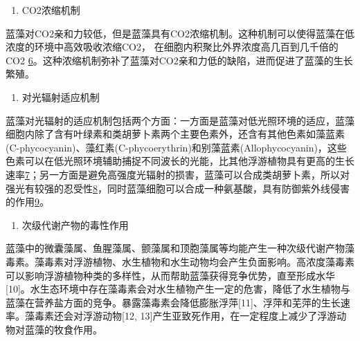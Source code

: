 \documentclass[]{book}
\providecommand{\tightlist}{%
  \setlength{\itemsep}{0pt}\setlength{\parskip}{0pt}}
\begin{document}
\begin{enumerate}
\def\labelenumi{\arabic{enumi}.}
\setcounter{enumi}{2}
\tightlist
\item
  CO2浓缩机制
\end{enumerate}

蓝藻对CO2亲和力较低，但是蓝藻具有CO2浓缩机制。这种机制可以使得蓝藻在低浓度的环境中高效吸收浓缩CO2， 在细胞内积聚比外界浓度高几百到几千倍的 CO2 \href{Gupta\%20V\%20K,\%20Ganjali\%20M\%20R,\%20et\%20al.\%20Chemical\%20Engineering\%20Journal,\%202012,\%20197:\%20330.}{6}。这种浓缩机制弥补了蓝藻对CO2亲和力低的缺陷，进而促进了蓝藻的生长繁殖。

\begin{enumerate}
\def\labelenumi{\arabic{enumi}.}
\setcounter{enumi}{3}
\tightlist
\item
  对光辐射适应机制
\end{enumerate}

蓝藻对光辐射的适应机制包括两个方面：一方面是蓝藻对低光照环境的适应，蓝藻细胞内除了含有叶绿素和类胡萝卜素两个主要色素外，还含有其他色素如藻蓝素(C-phycocyanin)、藻红素(C-phycoerythrin)和别藻蓝素(Allophycocyanin)，这些色素可以在低光照环境辅助捕捉不同波长的光能，比其他浮游植物具有更高的生长速率\href{Liu\%20R\%20L,\%20Liu\%20Y,\%20et\%20al.\%20Bioresourse\%20Technology\%202014,\%20154:\%20138.}{7}；另一方面是避免高强度光辐射的损害，蓝藻可以合成类胡萝卜素，所以对强光有较强的忍受性\href{Gao\%20F,Qu\%20J\%20Y,\%20et\%20al.\%20Electrochim.\%20Acta\%202016,\%20190:\%201134.}{8}，同时蓝藻细胞可以合成一种氨基酸，具有防御紫外线侵害的作用\href{Jiang\%20J,\%20Zhu\%20J\%20H,\%20et\%20al.\%20Energy\%20Environ.\%20Sci.\%202014,\%207:\%202670.}{9}。

\begin{enumerate}
\def\labelenumi{\arabic{enumi}.}
\setcounter{enumi}{4}
\tightlist
\item
  次级代谢产物的毒性作用
\end{enumerate}

蓝藻中的微囊藻属、鱼腥藻属、颤藻属和顶胞藻属等均能产生一种次级代谢产物藻毒素。藻毒素对浮游植物、水生植物和水生动物均会产生负面影响。高浓度藻毒素可以影响浮游植物种类的多样性，从而帮助蓝藻获得竞争优势，直至形成水华{[}10{]}。水生态环境中存在藻毒素会对水生植物产生一定的危害，降低了水生植物与蓝藻在营养盐方面的竞争。暴露藻毒素会降低膨胀浮萍{[}11{]}、浮萍和芜萍的生长速率。藻毒素还会对浮游动物{[}12, 13{]}产生亚致死作用，在一定程度上减少了浮游动物对蓝藻的牧食作用。
\end{document}
